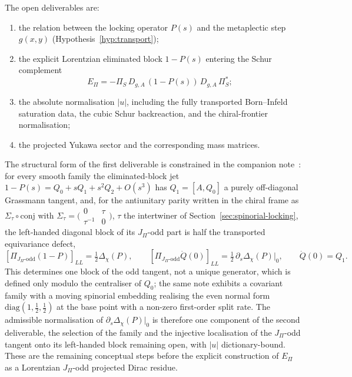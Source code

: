 \documentclass[11pt]{article}
\theoremstyle{definition}
\newcommand{\EPi}{E_\Pi}
\newcommand{\PiS}{\Pi_S}
\begin{document}
    The open deliverables are:
    \begin{enumerate}
      \item the relation between the locking operator $P(s)$ and the metaplectic step $g(x,y)$
      (Hypothesis~\ref{hyp:transport});
      \item the explicit Lorentzian eliminated block $1-P(s)$ entering the Schur complement
      \[
        \EPi=-\PiS\,D_{g,A}\,(1-P(s))\,D_{g,A}\,\PiS^{*};
      \]
      \item the absolute normalisation $|u|$, including the fully transported Born--Infeld saturation data, the
      cubic Schur backreaction, and the chiral-frontier normalisation;
      \item the projected Yukawa sector and the corresponding mass matrices.
    \end{enumerate}
    The structural form of the first deliverable is constrained in the companion note~\cite{Beau2026ebj}: for every
    smooth family the eliminated-block jet $1-P(s) = Q_0 + sQ_1 + s^2Q_2 + O(s^3)$ has $Q_1 = [A, Q_0]$ a purely
    off-diagonal Grassmann tangent, and, for the antiunitary parity written in the chiral frame as
    $\Sigma_\tau \circ \mathrm{conj}$ with $\Sigma_\tau = \bigl(\begin{smallmatrix} 0 & \tau \\ \tau^{-1} & 0
    \end{smallmatrix}\bigr)$, $\tau$ the intertwiner of Section~\ref{sec:spinorial-locking}, the left-handed diagonal
    block of its $J_\Pi$-odd part is half the transported equivariance defect,
    \[
      [\Pi_{J_\Pi\text{-odd}}(1-P)]_{LL} = \tfrac12\Delta_\chi(P),
      \qquad
      [\Pi_{J_\Pi\text{-odd}}\dot Q(0)]_{LL} = \tfrac12\,\partial_s\Delta_\chi(P)\big|_0,
      \qquad \dot Q(0) = Q_1.
    \]
    This determines one block of the odd tangent, not a unique generator, which is defined only modulo the centraliser
    of $Q_0$; the same note exhibits a covariant family with a moving spinorial embedding realising the even normal form
    $\mathrm{diag}(1, \tfrac12, \tfrac12)$ at the base point with a non-zero first-order split rate.
    The admissible normalisation of $\partial_s\Delta_\chi(P)|_0$ is therefore one component of the second deliverable,
    the selection of the family and the injective localisation of the $J_\Pi$-odd tangent onto its left-handed block
    remaining open, with $|u|$ dictionary-bound.
    These are the remaining conceptual steps before the explicit construction of $\EPi$ as a Lorentzian
    $J_\Pi$-odd projected Dirac residue.
\end{document}

